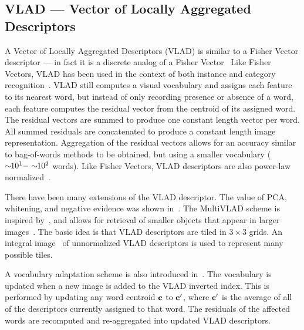     \subsection{VLAD --- Vector of Locally Aggregated Descriptors} 

        A Vector of Locally Aggregated Descriptors (VLAD) is similar to
          a Fisher Vector descriptor --- in fact it is a discrete analog
          of a Fisher Vector~\cite{jegou_aggregating_2010,
          jegou_aggregating_2012} Like Fisher Vectors, VLAD has been used
          in the context of both instance and category
          recognition~\cite{jegou_negative_2012,
          delhumeau_revisiting_2013, arandjelovic_all_2013}.
        VLAD still computes a visual vocabulary and assigns each
          feature to its nearest word, but instead of only recording
          presence or absence of a word, each feature computes the
          residual vector from the centroid of its assigned word.
        The residual vectors are summed to produce one constant length
          vector per word.
        All summed residuals are concatenated to produce a constant
          length image representation.
        Aggregation of the residual vectors allows for an accuracy
          similar to bag-of-words methods to be obtained, but using a
          smaller vocabulary ($\sim\mkern-6mu 10^{1} - \sim\mkern-6mu 10^{2}$
          words).
        Like Fisher Vectors, VLAD descriptors are also power-law
          normalized~\cite{jegou_aggregating_2012}.

        There have been many extensions of the VLAD descriptor.
        The value of PCA, whitening, and negative evidence was shown
          in~\cite{jegou_negative_2012}.
        The MultiVLAD scheme is inspired by~\cite{torii_visual_2011}, and
          allows for retrieval of smaller objects that appear in larger
          images~\cite{arandjelovic_all_2013}.
        The basic idea is that VLAD descriptors are tiled in $3 \times 3$
          grids.
        An integral image~\cite{viola_robust_2004} of unnormalized VLAD
          descriptors is used to represent many possible tiles.

        A vocabulary adaptation scheme is also introduced
          in~\cite{arandjelovic_all_2013}.
        The vocabulary is updated when a new image is added to the VLAD
          inverted index.
        This is performed by updating any word centroid $\mathbf{c}$ to $\mathbf{c}'$,
          where $\mathbf{c}'$ is the average of all of the descriptors currently
          assigned to that word.
        The residuals of the affected words are recomputed and
          re-aggregated into updated VLAD descriptors.

